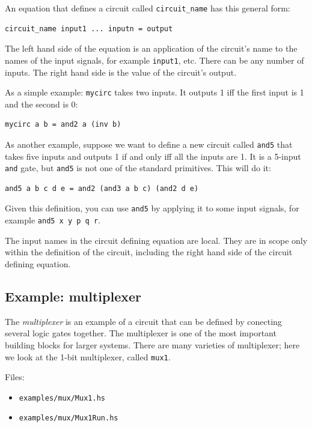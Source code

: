 \documentclass[]{svmono}
\begin{document}
An equation that defines a circuit called \texttt{circuit\_name} has this
general form:

\begin{verbatim}
circuit_name input1 ... inputn = output
\end{verbatim}

The left hand side of the equation is an application of the circuit's
name to the names of the input signals, for example \texttt{input1}, etc.
There can be any number of inputs.  The right hand side is the value
of the circuit's output.

As a simple example: \texttt{mycirc} takes two inputs.  It outputs 1 iff the
first input is 1 and the second is 0:

\begin{verbatim}
mycirc a b = and2 a (inv b)
\end{verbatim}

As another example, suppose we want to define a new circuit called
\texttt{and5} that takes five inputs and outputs 1 if and only iff all the
inputs are 1.  It is a 5-input \texttt{and} gate, but \texttt{and5} is not one of
the standard primitives.  This will do it:

\begin{verbatim}
and5 a b c d e = and2 (and3 a b c) (and2 d e)
\end{verbatim}

Given this definition, you can use \texttt{and5} by applying it to some input
signals, for example \texttt{and5 x y p q r}.

The input names in the circuit defining equation are local.  They are
in scope only within the definition of the circuit, including the
right hand side of the circuit defining equation.
\subsection*{Example: multiplexer}
\label{sec:orge83fda8}

The \emph{multiplexer} is an example of a circuit that can be defined by
conecting several logic gates together. The multiplexer is one of the
most important building blocks for larger systems.  There are many
varieties of multiplexer; here we look at the 1-bit multiplexer,
called \texttt{mux1}.

Files:
\begin{itemize}
\item \texttt{examples/mux/Mux1.hs}
\item \texttt{examples/mux/Mux1Run.hs}
\end{itemize}
\end{document}
